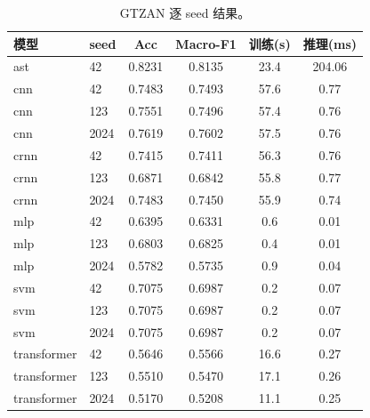 \begin{table}[H]
\centering\scriptsize
\caption{GTZAN 逐 seed 结果。}
\label{tab:mvp-perseed}
\begin{tabular}{llcccc}
\toprule
模型 & seed & Acc & Macro-F1 & 训练(s) & 推理(ms)\\
\midrule
ast & 42 & 0.8231 & 0.8135 & 23.4 & 204.06\\
cnn & 42 & 0.7483 & 0.7493 & 57.6 & 0.77\\
cnn & 123 & 0.7551 & 0.7496 & 57.4 & 0.76\\
cnn & 2024 & 0.7619 & 0.7602 & 57.5 & 0.76\\
crnn & 42 & 0.7415 & 0.7411 & 56.3 & 0.76\\
crnn & 123 & 0.6871 & 0.6842 & 55.8 & 0.77\\
crnn & 2024 & 0.7483 & 0.7450 & 55.9 & 0.74\\
mlp & 42 & 0.6395 & 0.6331 & 0.6 & 0.01\\
mlp & 123 & 0.6803 & 0.6825 & 0.4 & 0.01\\
mlp & 2024 & 0.5782 & 0.5735 & 0.9 & 0.04\\
svm & 42 & 0.7075 & 0.6987 & 0.2 & 0.07\\
svm & 123 & 0.7075 & 0.6987 & 0.2 & 0.07\\
svm & 2024 & 0.7075 & 0.6987 & 0.2 & 0.07\\
transformer & 42 & 0.5646 & 0.5566 & 16.6 & 0.27\\
transformer & 123 & 0.5510 & 0.5470 & 17.1 & 0.26\\
transformer & 2024 & 0.5170 & 0.5208 & 11.1 & 0.25\\
\bottomrule
\end{tabular}
\end{table}
